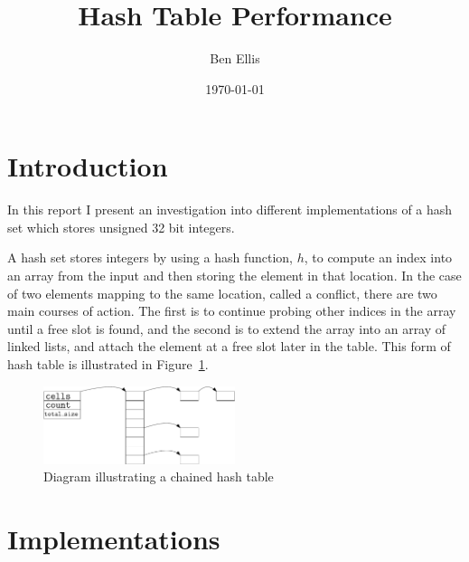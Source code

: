 \documentclass[12pt]{article}
\begin{document}
\title{Hash Table Performance}
\author{Ben Ellis}
\date{\today}
\maketitle

\section*{Introduction}
In this report I present an investigation into different implementations of
a hash set which stores unsigned 32 bit integers. 

A hash set stores integers by using a hash function, $h$, to compute an index
into an array from the input and then storing the element in that location. 
In the case of two elements mapping to the same location, called a conflict, there are two main
courses of action. The first is to continue probing other indices in the array until
a free slot is found, and the second is to extend the array into an array of linked lists, and
attach the element at a free slot later in the table. This form of hash table is illustrated in
Figure~\ref{fig:chaining}.

\begin{figure}
    \centering
    \includegraphics[width=0.5\textwidth]{chained_table}
    \caption{Diagram illustrating a chained hash table}\label{fig:chaining}
\end{figure}

\section*{Implementations}
\end{document}
